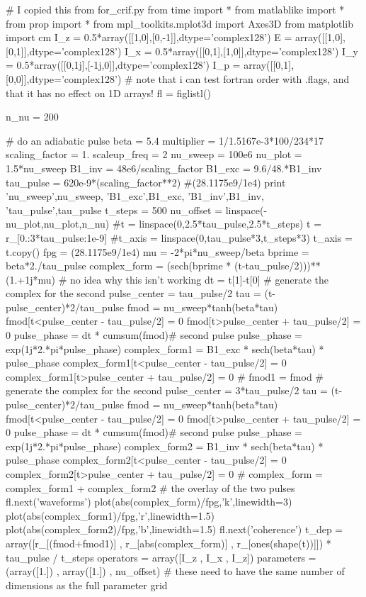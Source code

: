 \begin{python}
# I copied this from for_crif.py
from time import *
from matlablike import *
from prop import *
from mpl_toolkits.mplot3d import Axes3D
from matplotlib import cm
I_z = 0.5*array([[1,0],[0,-1]],dtype='complex128')
E = array([[1,0],[0,1]],dtype='complex128')
I_x = 0.5*array([[0,1],[1,0]],dtype='complex128')
I_y = 0.5*array([[0,1j],[-1j,0]],dtype='complex128')
I_p = array([[0,1],[0,0]],dtype='complex128')
# note that i can test fortran order with .flags, and that it has no effect on 1D arrays!
fl = figlistl()

n_nu = 200

# do an adiabatic pulse
beta = 5.4
multiplier = 1/1.5167e-3*100/234*17
scaling_factor = 1.
scaleup_freq = 2
nu_sweep = 100e6
nu_plot = 1.5*nu_sweep
B1_inv = 48e6/scaling_factor
B1_exc = 9.6/48.*B1_inv
tau_pulse = 620e-9*(scaling_factor**2)
#(28.1175e9/1e4)
print 'nu_sweep',nu_sweep, 'B1_exc',B1_exc, 'B1_inv',B1_inv, 'tau_pulse',tau_pulse
t_steps = 500
nu_offset = linspace(-nu_plot,nu_plot,n_nu)
#t = linspace(0,2.5*tau_pulse,2.5*t_steps)
t = r_[0.:3*tau_pulse:1e-9]
#t_axis = linspace(0,tau_pulse*3,t_steps*3)
t_axis = t.copy()
fpg = (28.1175e9/1e4)
mu = -2*pi*nu_sweep/beta
bprime = beta*2./tau_pulse
complex_form = (sech(bprime * (t-tau_pulse/2)))**(1.+1j*mu) # no idea why this isn't working
dt = t[1]-t[0]
#{{{ generate the complex for the second
pulse_center = tau_pulse/2
tau = (t-pulse_center)*2/tau_pulse
fmod = nu_sweep*tanh(beta*tau)
fmod[t<pulse_center - tau_pulse/2] = 0
fmod[t>pulse_center + tau_pulse/2] = 0
pulse_phase = dt * cumsum(fmod)# second pulse
pulse_phase = exp(1j*2.*pi*pulse_phase)
complex_form1 = B1_exc * sech(beta*tau) * pulse_phase
complex_form1[t<pulse_center - tau_pulse/2] = 0
complex_form1[t>pulse_center + tau_pulse/2] = 0
#}}}
fmod1 = fmod
#{{{ generate the complex for the second
pulse_center = 3*tau_pulse/2
tau = (t-pulse_center)*2/tau_pulse
fmod = nu_sweep*tanh(beta*tau)
fmod[t<pulse_center - tau_pulse/2] = 0
fmod[t>pulse_center + tau_pulse/2] = 0
pulse_phase = dt * cumsum(fmod)# second pulse
pulse_phase = exp(1j*2.*pi*pulse_phase)
complex_form2 = B1_inv * sech(beta*tau) * pulse_phase
complex_form2[t<pulse_center - tau_pulse/2] = 0
complex_form2[t>pulse_center + tau_pulse/2] = 0
#}}}
complex_form = complex_form1 + complex_form2 # the overlay of the two pulses
fl.next('waveforms')
plot(abs(complex_form)/fpg,'k',linewidth=3)
plot(abs(complex_form1)/fpg,'r',linewidth=1.5)
plot(abs(complex_form2)/fpg,'b',linewidth=1.5)
fl.next('coherence')
t_dep = array([r_[(fmod+fmod1)] , r_[abs(complex_form)] , r_[ones(shape(t))]]) * tau_pulse / t_steps
operators = array([I_z          , I_x                   , I_z])
parameters = (array([1.])       , array([1.])           , nu_offset) # these need to have the same number of dimensions as the full parameter grid


\end{python}
